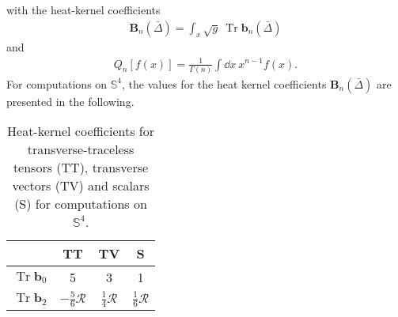 with the heat-kernel coefficients 
\begin{align}
	\mathbf{B}_{n}(\bar{\Delta})=\int_x  \sqrt{g} \  \operatorname{Tr} \mathbf{b}_{n}(\bar{\Delta})
\end{align}
and 
\begin{align}
	Q_{n}[f(x)]=\frac{1}{\Gamma(n)} \int \dd x \ x^{n-1} f(x).\label{eqn:Qfunc}
\end{align}
\newpage
For computations on $\mathbb{S}^4$, the values for the heat kernel coefficients $\mathbf{B}_n(\bar{\Delta})$ are presented in the following.
\begin{table}[H]
	\centering
	\setlength{\tabcolsep}{5mm}
	\setlength\extrarowheight{2mm}
	\begin{tabular}{c | c c c}
	   & TT & TV & S\\ \hline
	   $\operatorname{Tr} \mathbf{b}_{0}$ & 5 &  3 & 1\\
	  $\operatorname{Tr} \mathbf{b}_{2}$ & $-\frac{5}{6}\mathcal{R}$ & $\frac{1}{4}\mathcal{R}$& $\frac{1}{6}\mathcal{R}$\\
	\end{tabular}
	\caption{Heat-kernel coefficients for transverse-traceless tensors (TT), transverse vectors (TV) and scalars (S) for computations on $\mathbb{S}^4$.}
\end{table}

